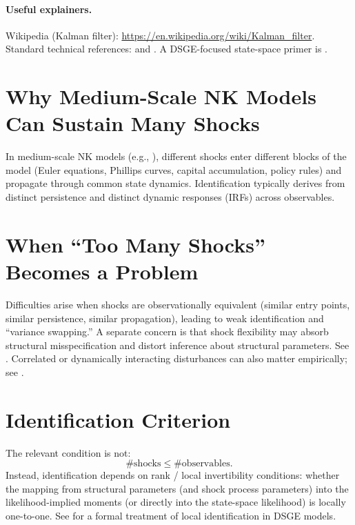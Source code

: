 \documentclass[11pt]{article}
\begin{document}
\paragraph{Useful explainers.}
Wikipedia (Kalman filter): \url{https://en.wikipedia.org/wiki/Kalman_filter}.
Standard technical references: \citet{durbin2012} and \citet{hamilton1994}. A DSGE-focused state-space primer is \citet{an2007}.

\section{Why Medium-Scale NK Models Can Sustain Many Shocks}

In medium-scale NK models (e.g., \citealt{smets2007}), different shocks enter different blocks of the model (Euler equations,
Phillips curves, capital accumulation, policy rules) and propagate through common state dynamics. Identification typically
derives from distinct persistence and distinct dynamic responses (IRFs) across observables.

\section{When ``Too Many Shocks'' Becomes a Problem}

Difficulties arise when shocks are observationally equivalent (similar entry points, similar persistence, similar propagation),
leading to weak identification and ``variance swapping.'' A separate concern is that shock flexibility may absorb structural
misspecification and distort inference about structural parameters. See \citet{denhaan2021asd}. Correlated or dynamically
interacting disturbances can also matter empirically; see \citet{curdia2012}.

\section{Identification Criterion}

The relevant condition is not:
\begin{equation}
\#\text{shocks} \le \#\text{observables}.
\end{equation}
Instead, identification depends on rank / local invertibility conditions: whether the mapping from structural parameters (and
shock process parameters) into the likelihood-implied moments (or directly into the state-space likelihood) is locally one-to-one.
See \citet{iskrev2010} for a formal treatment of local identification in DSGE models.
\end{document}
